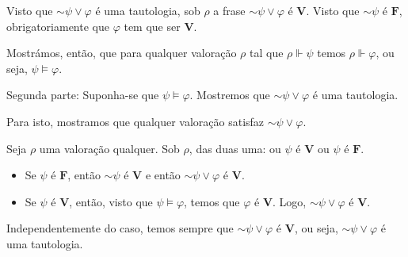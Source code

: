 \documentclass{article}
\theoremstyle{definition}
\theoremstyle{remark}
\newcommand{\V}{\mathbf{V}}
\newcommand{\F}{\mathbf{F}}
\newcommand*{\lneg}{\mathord{\sim}}
\begin{document}
	Visto que $\lneg \psi \lor \varphi$ é uma tautologia, sob $\rho$ a frase $\lneg \psi \lor \varphi$ é $\V$. Visto que $\lneg \psi$ é $\F$, obrigatoriamente que $\varphi$ tem que ser $\V$.
	
	Mostrámos, então, que para qualquer valoração $\rho$ tal que $\rho \Vdash \psi$ temos $\rho \Vdash \varphi$, ou seja, $\psi \vDash \varphi$.
	
	\smallskip
	
	Segunda parte: Suponha-se que $\psi \vDash \varphi$. Mostremos que $\lneg \psi \lor \varphi$ é uma tautologia.
	
	Para isto, mostramos que qualquer valoração satisfaz $\lneg \psi \lor \varphi$.
	
	Seja $\rho$ uma valoração qualquer. Sob $\rho$, das duas uma: ou $\psi$ é $\V$ ou $\psi$ é $\F$.
	
	\begin{itemize}	
	\item Se $\psi$ é $\F$, então $\lneg \psi$ é $\V$ e então $\lneg \psi \lor \varphi$ é $\V$.
	
	\item Se $\psi$ é $\V$, então, visto que $\psi \vDash \varphi$, temos que $\varphi$ é $\V$. Logo, $\lneg \psi \lor \varphi$ é $\V$.
	\end{itemize}
	
	Independentemente do caso, temos sempre que $\lneg \psi \lor \varphi$ é $\V$, ou seja, $\lneg \psi \lor \varphi$ é uma tautologia.
	
\end{document}

